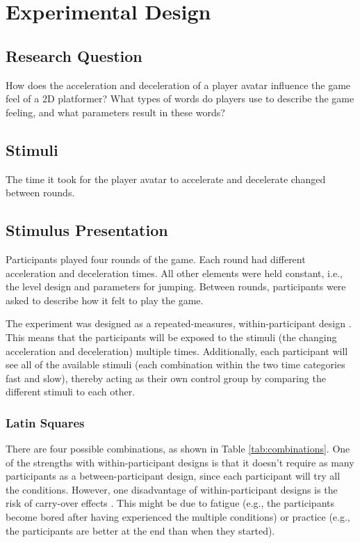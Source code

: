 \section{Experimental Design} \label{experimentalDesign}
\subsection{Research Question}
How does the acceleration and deceleration of a player avatar influence the game feel of a 2D platformer? What types of words do players use to describe the game feeling, and what parameters result in these words?

\subsection{Stimuli}
The time it took for the player avatar to accelerate and decelerate changed between rounds.

\subsection{Stimulus Presentation}
Participants played four rounds of the game. Each round had different acceleration and deceleration times. All other elements were held constant, i.e., the level design and parameters for jumping. Between rounds, participants were asked to describe how it felt to play the game.

The experiment was designed as a repeated-measures, within-participant design \cite{cunningham}. This means that the participants will be exposed to the stimuli (the changing acceleration and deceleration) multiple times. Additionally, each participant will see all of the available stimuli (each combination within the two time categories fast and slow), thereby acting as their own control group by comparing the different stimuli to each other.

\subsubsection{Latin Squares} \label{latinSection}
There are four possible combinations, as shown in Table \ref{tab:combinations}. One of the strengths with within-participant designs is that it doesn't require as many participants as a between-participant design, since each participant will try all the conditions. However, one disadvantage of within-participant designs is the risk of carry-over effects \cite{experimental1}. This might be due to fatigue (e.g., the participants become bored after having experienced the multiple conditions) or practice (e.g., the participants are better at the end than when they started).

